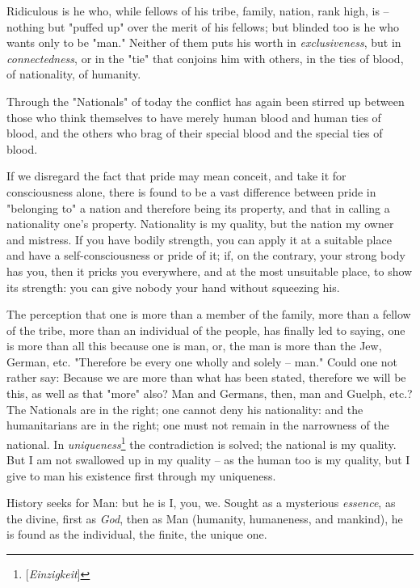 \documentclass[a4paper]{book}
\begin{document}
Ridiculous is he who, while fellows of his tribe, family, nation, rank high, 
is -- nothing but "{}puffed up"{} over the merit of his fellows; but blinded 
too is he who wants only to be "{}man."{} Neither of them puts his worth in 
\textit{exclusiveness}, but in \textit{connectedness}, or in the "{}tie"{} 
that conjoins him with others, in the ties of blood, of nationality, of 
humanity.

Through the "{}Nationals"{} of today the conflict has again been stirred up 
between those who think themselves to have merely human blood and human ties 
of blood, and the others who brag of their special blood and the special ties 
of blood.

If we disregard the fact that pride may mean conceit, and take it for 
consciousness alone, there is found to be a vast difference between pride in 
"{}belonging to"{} a nation and therefore being its property, and that in 
calling a nationality one's property. Nationality is my quality, but the 
nation my owner and mistress. If you have bodily strength, you can apply it at 
a suitable place and have a self-consciousness or pride of it; if, on the 
contrary, your strong body has you, then it pricks you everywhere, and at the 
most unsuitable place, to show its strength: you can give nobody your hand 
without squeezing his.

The perception that one is more than a member of the family, more than a 
fellow of the tribe, more than an individual of the people, has finally led to 
saying, one is more than all this because one is man, or, the man is more than 
the Jew, German, etc. "{}Therefore be every one wholly and solely -- man."{} 
Could one not rather say: Because we are more than what has been stated, 
therefore we will be this, as well as that "{}more"{} also? Man and Germans, 
then, man and Guelph, etc.? The Nationals are in the right; one cannot deny 
his nationality: and the humanitarians are in the right; one must not remain 
in the narrowness of the national. In 
\textit{uniqueness}\footnote{[\textit{Einzigkeit}]} the contradiction is 
solved; the national is my quality. But I am not swallowed up in my quality -- 
as the human too is my quality, but I give to man his existence first through 
my uniqueness.

History seeks for Man: but he is I, you, we. Sought as a mysterious 
\textit{essence}, as the divine, first as \textit{God}, then as Man (humanity, 
humaneness, and mankind), he is found as the individual, the finite, the 
unique one.
\end{document}
